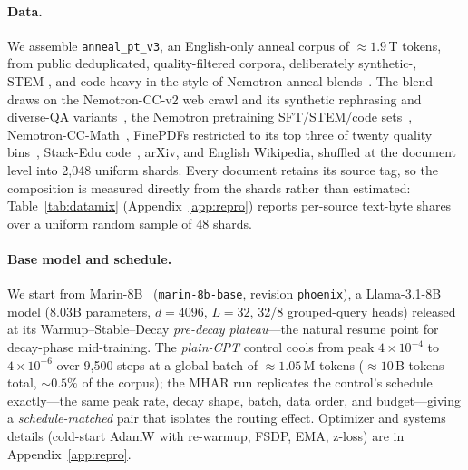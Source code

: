 \documentclass{article}
\begin{document}
\paragraph{Data.} We assemble \texttt{anneal\_pt\_v3}, an English-only anneal
corpus of $\approx 1.9$\,T tokens, from public deduplicated, quality-filtered
corpora,
deliberately synthetic-, STEM-, and code-heavy in the style of Nemotron anneal
blends~\citep{su2024nemotroncc}. The blend draws on the Nemotron-CC-v2 web crawl
and its synthetic rephrasing and diverse-QA variants~\citep{nvidia2025nemotronccv2},
the Nemotron pretraining SFT/STEM/code sets~\citep{nvidia2025nemotronsft},
Nemotron-CC-Math~\citep{nvidia2025nemotronccmath}, FinePDFs restricted to its top
three of twenty quality bins~\citep{hf2025finepdfs}, Stack-Edu
code~\citep{hf2025stackedu}, arXiv, and English Wikipedia, shuffled at the
document level into 2{,}048 uniform shards. Every document retains its source
tag, so the composition is measured directly from the shards rather than
estimated: Table~\ref{tab:datamix} (Appendix~\ref{app:repro}) reports per-source
text-byte shares over a uniform random sample of 48 shards.

\paragraph{Base model and schedule.} We start from Marin-8B~\citep{marin2025}
(\texttt{marin-8b-base}, revision \texttt{phoenix}), a Llama-3.1-8B model (8.03B
parameters, $d{=}4096$, $L{=}32$, 32/8 grouped-query heads) released at its
Warmup--Stable--Decay \emph{pre-decay plateau}---the natural resume point for
decay-phase mid-training. The \emph{plain-CPT} control cools from peak
$4\times10^{-4}$ to $4\times10^{-6}$ over 9{,}500 steps at a global batch of
$\approx 1.05$\,M tokens ($\approx 10$\,B tokens total, $\sim0.5\%$ of the
corpus); the MHAR run replicates the control's schedule exactly---the same peak
rate, decay shape, batch, data order, and budget---giving a
\emph{schedule-matched} pair that isolates the routing effect. Optimizer and
systems details (cold-start AdamW with re-warmup, FSDP, EMA, z-loss) are in
Appendix~\ref{app:repro}.
\end{document}
